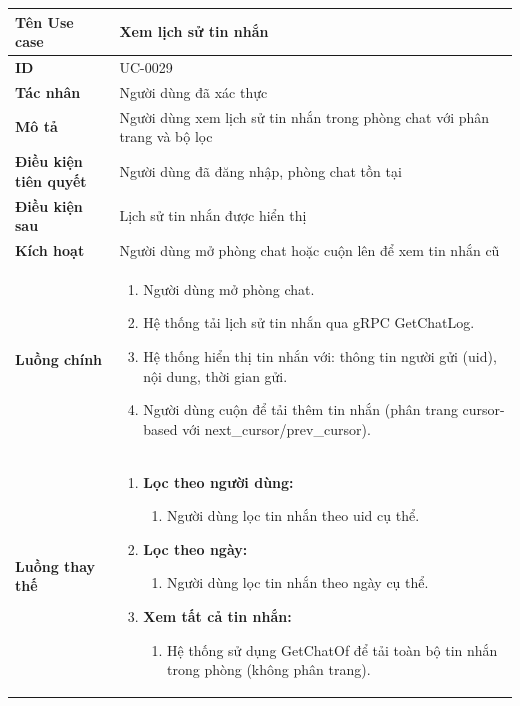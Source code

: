 {
\small
\renewcommand{\arraystretch}{1.15}

\begin{tabularx}{\textwidth}{|>{\raggedright\arraybackslash}p{3.5cm}|>{\raggedright\arraybackslash}X|}
\hline
\textbf{Tên Use case} & Xem lịch sử tin nhắn \\
\hline
\textbf{ID} & UC-0029 \\
\hline
\textbf{Tác nhân} & Người dùng đã xác thực \\
\hline
\textbf{Mô tả} & Người dùng xem lịch sử tin nhắn trong phòng chat với phân trang và bộ lọc \\
\hline
\textbf{Điều kiện tiên quyết} & Người dùng đã đăng nhập, phòng chat tồn tại \\
\hline
\textbf{Điều kiện sau} & Lịch sử tin nhắn được hiển thị \\
\hline
\textbf{Kích hoạt} & Người dùng mở phòng chat hoặc cuộn lên để xem tin nhắn cũ \\
\hline
\textbf{Luồng chính} &
\begin{enumerate}
    \item Người dùng mở phòng chat.
    \item Hệ thống tải lịch sử tin nhắn qua gRPC GetChatLog.
    \item Hệ thống hiển thị tin nhắn với: thông tin người gửi (uid), nội dung, thời gian gửi.
    \item Người dùng cuộn để tải thêm tin nhắn (phân trang cursor-based với next\_cursor/prev\_cursor).
\end{enumerate} \\
\hline
\textbf{Luồng thay thế} &
\begin{enumerate}
    \item \textbf{Lọc theo người dùng:}
    \begin{enumerate}
        \item[2A.] Người dùng lọc tin nhắn theo uid cụ thể.
    \end{enumerate}
    \item \textbf{Lọc theo ngày:}
    \begin{enumerate}
        \item[2B.] Người dùng lọc tin nhắn theo ngày cụ thể.
    \end{enumerate}
    \item \textbf{Xem tất cả tin nhắn:}
    \begin{enumerate}
        \item[2C.] Hệ thống sử dụng GetChatOf để tải toàn bộ tin nhắn trong phòng (không phân trang).

\end{enumerate}
\end{enumerate}
\end{tabularx}}
